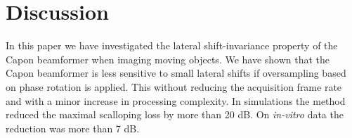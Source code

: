 \documentclass[journal]{IEEEtran}
\begin{document}
\section{Discussion}\label{sec:dis}
In this paper we have investigated the lateral shift-invariance property of the Capon beamformer when imaging moving objects. We have shown that the Capon beamformer is less sensitive to small lateral shifts if oversampling based on phase rotation is applied. This without reducing the acquisition frame rate and with a minor increase in processing complexity. %
In simulations the method reduced the maximal scalloping loss by more than 20 dB. On \textit{in-vitro} data the reduction was more than 7 dB.

\end{document}
